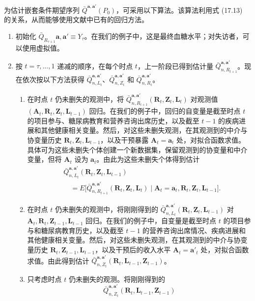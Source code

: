 为估计嵌套条件期望序列 $\bar Q^{\mathbf a,\mathbf a'}(P_0)$，可采用以下算法。该算法利用式 (17.13) 的关系，从而能够使用文献中已有的回归方法。
\begin{enumerate}[label=\arabic*.]
 \item 初始化 $\bar Q_{R_{\tau+1}}\mathbf a,\mathbf a'\equiv Y_\tau$。在我们的例子中，这是最终血糖水平；对失访者，可以使用虚拟值。
 \item 按 $t=\tau,\ldots,1$ 递减的顺序，在每个时点 $t$，上一阶段已得到估计量 $\bar Q_{n,R_{t+1}}^{\mathbf a,\mathbf a'}$。现在依次按以下方法获得 $\bar Q_{n,L_t}^{\mathbf a,\mathbf a'}$、$\bar Q_{n,Z_t}^{\mathbf a,\mathbf a'}$ 和 $\bar Q_{n,R_t}^{\mathbf a,\mathbf a'}$。
 \begin{enumerate}[label=(\alph*),leftmargin=2.4em]
  \item 在时点 $t$ 仍未删失的观测中，将 $\bar Q_{n,R_{t+1}}^{\mathbf a,\mathbf a'}(\mathbf R_t,\mathbf Z_t,\mathbf L_t)$ 对观测值 $(\mathbf A_t,\mathbf R_t,\mathbf Z_t,\mathbf L_{t-1})$ 回归。在我们的例子中，回归的自变量是截至时点 $t$ 的项目参与、糖尿病教育和营养咨询出席历史，以及截至 $t-1$ 的疾病进展和其他健康相关变量。然后，对这些未删失观测，在其观测到的中介与协变量历史 $\mathbf R_t,\mathbf Z_t,\mathbf L_{t-1}$，以及干预暴露 $\mathbf A_t=\mathbf a_t$ 处，对拟合函数求值。具体可为这些未删失个体创建一个新数据集，保留观测到的协变量和中介变量，但将 $\mathbf A_t$ 设为 $\mathbf a_t$。由此为这些未删失个体得到估计
  \[
  \begin{aligned}
   &\bar Q_{n,L_t}^{\mathbf a,\mathbf a'}(\mathbf R_t,\mathbf Z_t,\mathbf L_{t-1})\\
   &\quad=E\bigl[\bar Q_{n,R_{t+1}}^{\mathbf a,\mathbf a'}(\mathbf R_t,\mathbf Z_t,\mathbf L_t)
   \mid\mathbf A_t=\mathbf a_t,\mathbf R_t,\mathbf Z_t,\mathbf L_{t-1}\bigr].
  \end{aligned}
  \]
  \item 在时点 $t$ 仍未删失的观测中，将刚刚得到的 $\bar Q_{n,L_t}^{\mathbf a,\mathbf a'}(\mathbf R_t,\mathbf Z_t,\mathbf L_{t-1})$ 对 $\mathbf A_t,\mathbf R_t,\mathbf Z_{t-1},\mathbf L_{t-1}$ 回归。在我们的例子中，自变量是截至时点 $t$ 的项目参与和糖尿病教育历史，以及截至 $t-1$ 的营养咨询出席情况、疾病进展和其他健康相关变量。然后，对这些未删失观测，在其观测到的中介与协变量历史 $\mathbf R_t,\mathbf Z_{t-1},\mathbf L_{t-1}$，以及干预后的收入水平 $\mathbf A_t=\mathbf a'_t$ 处，对拟合函数求值。由此得到估计 $\bar Q_{n,Z_t}^{\mathbf a,\mathbf a'}(\mathbf R_t,\mathbf L_{t-1},\mathbf Z_{t-1})$。
  \item 只考虑时点 $t$ 仍未删失的观测。将刚刚得到的
  \[
   \bar Q_{n,Z_t}^{\mathbf a,\mathbf a'}(\mathbf R_t,\mathbf L_{t-1},\mathbf Z_{t-1})
\]
\end{enumerate}
\end{enumerate}
